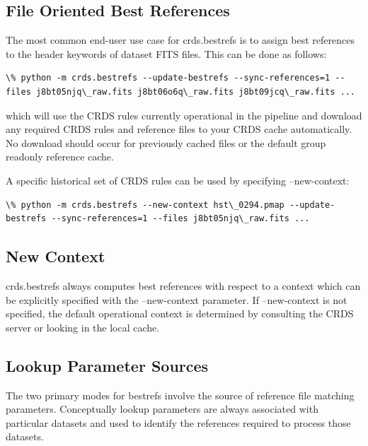 \documentclass[letterpaper,10pt,english]{sphinxmanual}
\begin{document}
\subsection{File Oriented Best References}
\label{command_line_tools:file-oriented-best-references}
The most common end-user use case for crds.bestrefs is to assign best references to the header keywords of
dataset FITS files.   This can be done as follows:

\begin{Verbatim}[commandchars=\\\{\}]
\% python -m crds.bestrefs --update-bestrefs --sync-references=1 --files j8bt05njq\_raw.fits j8bt06o6q\_raw.fits j8bt09jcq\_raw.fits ...
\end{Verbatim}

which will use the CRDS rules currently operational in the pipeline and download any required CRDS rules and reference files
to your CRDS cache automatically.   No download should occur for previously cached files or the default group readonly reference
cache.

A specific historical set of CRDS rules can be used by specifying --new-context:

\begin{Verbatim}[commandchars=\\\{\}]
\% python -m crds.bestrefs --new-context hst\_0294.pmap --update-bestrefs --sync-references=1 --files j8bt05njq\_raw.fits ...
\end{Verbatim}


\subsection{New Context}
\label{command_line_tools:new-context}
crds.bestrefs always computes best references with respect to a context which can be explicitly specified with the
--new-context parameter.    If --new-context is not specified,  the default operational context is determined by
consulting the CRDS server or looking in the local cache.


\subsection{Lookup Parameter Sources}
\label{command_line_tools:lookup-parameter-sources}
The two primary modes for bestrefs involve the source of reference file matching parameters.   Conceptually
lookup parameters are always associated with particular datasets and used to identify the references
required to process those datasets.
\end{document}
